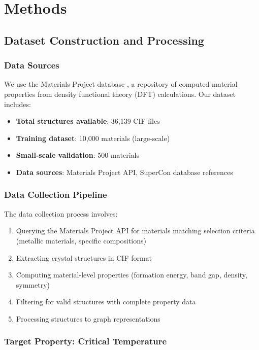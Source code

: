 \documentclass[11pt,a4paper]{article}
\begin{document}
\section{Methods}

\subsection{Dataset Construction and Processing}

\subsubsection{Data Sources}

We use the Materials Project database \citep{jain2013commentary}, a repository of computed material properties from density functional theory (DFT) calculations. Our dataset includes:

\begin{itemize}
    \item \textbf{Total structures available}: 36,139 CIF files
    \item \textbf{Training dataset}: 10,000 materials (large-scale)
    \item \textbf{Small-scale validation}: 500 materials
    \item \textbf{Data sources}: Materials Project API, SuperCon database references
\end{itemize}

\subsubsection{Data Collection Pipeline}

The data collection process involves:

\begin{enumerate}
    \item Querying the Materials Project API for materials matching selection criteria (metallic materials, specific compositions)
    \item Extracting crystal structures in CIF format
    \item Computing material-level properties (formation energy, band gap, density, symmetry)
    \item Filtering for valid structures with complete property data
    \item Processing structures to graph representations
\end{enumerate}

\subsubsection{Target Property: Critical Temperature}
\end{document}
